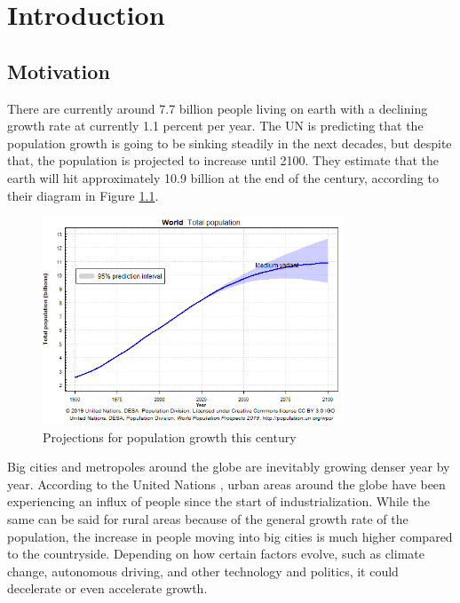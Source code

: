 
\chapter{Introduction}\label{chapter:introduction}
\section{Motivation}

There are currently around 7.7 billion people living on earth with a declining growth rate at currently 1.1 percent per year. The UN \cite{populationfacts} is predicting that the population growth is going to be sinking steadily in the next decades, but despite that, the population is projected to increase until 2100. They estimate that the earth will hit approximately 10.9 billion at the end of the century, according to their diagram in Figure \ref{fig:population}.

\begin{figure}[htpb]
  \centering
  \includegraphics[width=0.8\textwidth]{figures/population.png}
  \caption{Projections for population growth this century \cite{populationdata}}
  \label{fig:population}
\end{figure}

Big cities and metropoles around the globe are inevitably growing denser year by year. According to the United Nations \cite{growth}\cite{populationdata}, urban areas around the globe have been experiencing an influx of people since the start of industrialization. While the same can be said for rural areas because of the general growth rate of the population, the increase in people moving into big cities is much higher compared to the countryside.
Depending on how certain factors evolve, such as climate change, autonomous driving, and other technology and politics, it could decelerate or even accelerate growth.

